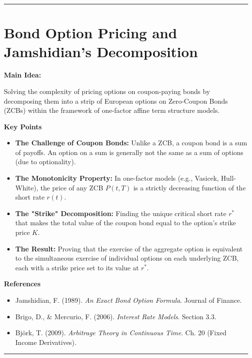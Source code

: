 \documentclass[12pt,a4paper]{article}
\begin{document}
\vspace{0.5cm}
\hrule
\vspace{0.5cm}

\section{Bond Option Pricing and Jamshidian's Decomposition}

\textbf{Main Idea:}

Solving the complexity of pricing options on coupon-paying bonds by decomposing them into a strip of European options on Zero-Coupon Bonds (ZCBs) within the framework of one-factor affine term structure models.

\medskip
\textbf{Key Points}
\begin{itemize}
\item \textbf{The Challenge of Coupon Bonds:} Unlike a ZCB, a coupon bond is a sum of payoffs. An option on a sum is generally not the same as a sum of options (due to optionality).

\item \textbf{The Monotonicity Property:} In one-factor models (e.g., Vasicek, Hull-White), the price of any ZCB $P(t, T)$ is a strictly decreasing function of the short rate $r(t)$.

\item \textbf{The "Strike" Decomposition:} Finding the unique critical short rate $r^*$ that makes the total value of the coupon bond equal to the option's strike price $K$.

\item \textbf{The Result:} Proving that the exercise of the aggregate option is equivalent to the simultaneous exercise of individual options on each underlying ZCB, each with a strike price set to its value at $r^*$.

\end{itemize}

\medskip
\textbf{References}
\begin{itemize}
\item[-] Jamshidian, F. (1989). \textit{An Exact Bond Option Formula}. Journal of Finance.
\item[-] Brigo, D., \& Mercurio, F. (2006). \textit{Interest Rate Models}. Section 3.3.
\item[-] Björk, T. (2009). \textit{Arbitrage Theory in Continuous Time}. Ch. 20 (Fixed Income Derivatives).
\end{itemize}

\vspace{0.5cm}
\hrule
\vspace{0.5cm}
\end{document}
